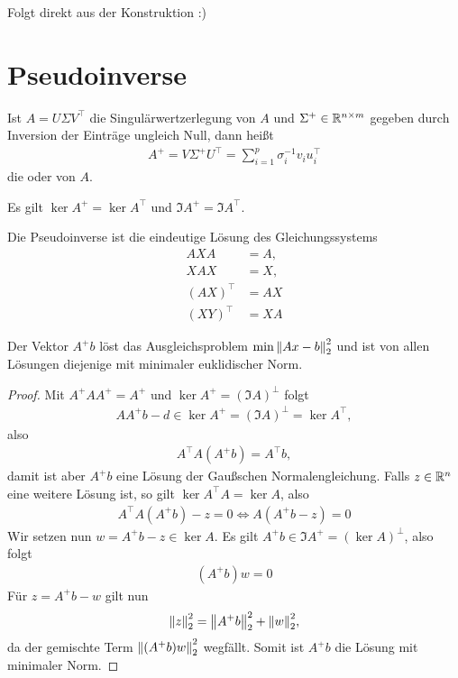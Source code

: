 \documentclass{report}
\begin{document}
	\begin{proofsketch}
		Folgt direkt aus der Konstruktion :)
	\end{proofsketch}
	\section{Pseudoinverse}
	\begin{definition}
		Ist $A = U \Sigma V^\top$ die Singulärwertzerlegung von $A$ und $\Sigma^+ \in \mathbb{R}^{n \times m}$ gegeben durch Inversion der Einträge ungleich Null, dann heißt
		\begin{align*}
			A^+ = V \Sigma^+ U^\top = \sum_{i = 1}^p \sigma^{-1}_i v_i u_i^\top
		\end{align*}
		die  oder  von $A$.
	\end{definition}
	\begin{anmerkung}
		Es gilt $\ker A^+ = \ker A^\top$ und $\Im A^+ = \Im A^\top$.
	\end{anmerkung}
	\begin{anmerkung}
		Die Pseudoinverse ist die eindeutige Lösung des Gleichungssystems
		\begin{align*}
			AXA &= A,\\
			XAX &= X,\\
			(AX)^\top &= AX\\
			(XY)^\top &= XA
		\end{align*}
	\end{anmerkung}
	\begin{theorem}
		Der Vektor $A^+ b$ löst das Ausgleichsproblem $\min \norm{Ax - b}_2^2$ und ist von allen Lösungen diejenige mit minimaler euklidischer Norm.
	\end{theorem}
	\begin{proof}
		Mit $A^+A A^+ = A^+$ und $\ker A^+ = (\Im A)^\bot$ folgt 
		\begin{align*}
			A A^+ b - d \in \ker A^+ = (\Im A)^\bot = \ker A^\top,
		\end{align*}
		also
		\begin{align*}
			A^\top A(A^+ b) = A^\top b,
		\end{align*}
		damit ist aber $A^+b$ eine Lösung der Gaußschen Normalengleichung.
		\newpar
		Falls $z \in \mathbb{R}^n$ eine weitere Lösung ist, so gilt $\ker A^\top A = \ker A$, also
		\begin{align*}
			A^\top A(A^+ b) - z = 0 \Leftrightarrow A(A^+b - z) = 0
		\end{align*}
		Wir setzen nun $w = A^+ b - z \in \ker A$. Es gilt $A^+ b \in \Im A^+ = (\ker A)^\bot$, also folgt
		\begin{align*}
			(A^+ b)w = 0
		\end{align*}
		Für $z = A^+ b - w$ gilt nun
		\begin{align*}
			\norm{z}_2^2 = \norm{A^+ b}_2^2 + \norm{w}_2^2,
		\end{align*}
		da der gemischte Term $\norm{(A^+b)w}_2^2$ wegfällt. Somit ist $A^+b$ die Lösung mit minimaler Norm.
	\end{proof}
\end{document}

